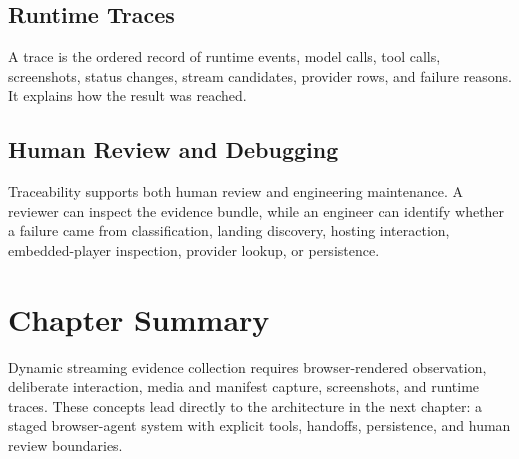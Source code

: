 \subsection{Runtime Traces}

A trace is the ordered record of runtime events, model calls, tool calls,
screenshots, status changes, stream candidates, provider rows, and failure
reasons. It explains how the result was reached.

\subsection{Human Review and Debugging}

Traceability supports both human review and engineering maintenance. A reviewer
can inspect the evidence bundle, while an engineer can identify whether a
failure came from classification, landing discovery, hosting interaction,
embedded-player inspection, provider lookup, or persistence.

\section{Chapter Summary}

Dynamic streaming evidence collection requires browser-rendered observation,
deliberate interaction, media and manifest capture, screenshots, and runtime
traces. These concepts lead directly to the architecture in the next chapter:
a staged browser-agent system with explicit tools, handoffs, persistence, and
human review boundaries.
